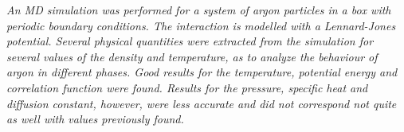 \emph{An MD simulation was performed for a system of argon particles in a box with periodic boundary conditions. The interaction is modelled with a Lennard-Jones potential. Several physical quantities were extracted from the simulation for several values of the density and temperature, as to analyze the behaviour of argon in different phases. Good results for the temperature, potential energy and correlation function were found. Results for the pressure, specific heat and diffusion constant, however, were less accurate and did not correspond not quite as well with values previously found.}